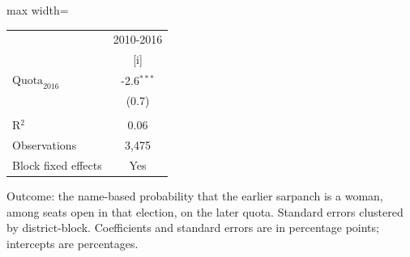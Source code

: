 
\begingroup
\centering
\scriptsize
\begin{adjustbox}{max width=\linewidth}
   \begin{threeparttable}[b]
      \begin{tabular}{lc}
         \toprule
                                & 2010-2016 \\
                                & [i]\\
         \midrule
         $\text{Quota}_{2016}$  & -2.6$^{***}$\\
                                & (0.7)\\
          \\
         R$^2$                  & 0.06\\
         Observations           & 3,475\\
         Block fixed effects    & Yes\\
         \bottomrule
      \end{tabular}

      \begin{tablenotes}
         \item Outcome: the name-based probability that the earlier sarpanch is a woman, among seats open in that election, on the later quota. Standard errors clustered by district-block. Coefficients and standard errors are in percentage points; intercepts are percentages.
      \end{tablenotes}
   \end{threeparttable}
\end{adjustbox}
\par\endgroup


